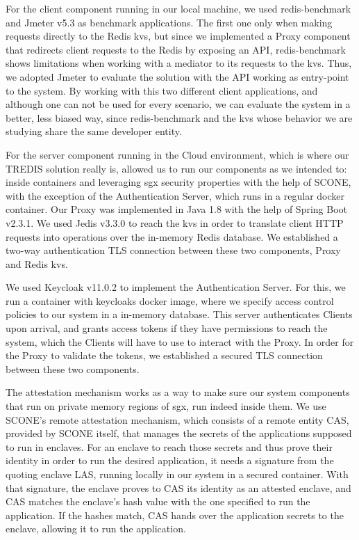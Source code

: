 For the client component running in our local machine, we used redis-benchmark and Jmeter v5.3 as benchmark applications. 
The first one only when making requests directly to the Redis \gls{kvs}, but since we implemented a Proxy component that redirects client requests to the Redis by exposing an API, redis-benchmark shows limitations when working with a mediator to its requests to the \gls{kvs}. Thus, we adopted Jmeter to evaluate the solution with the API working as entry-point to the system. By working with this two different client applications, and although one can not be used for every scenario, we can evaluate the system in a better, less biased way, since redis-benchmark and the \gls{kvs} whose behavior we are studying share the same developer entity.

For the server component running in the Cloud environment, which is where our TREDIS solution really is, allowed us to run our components as we intended to: inside containers and leveraging \gls{sgx} security properties with the help of SCONE, with the exception of the Authentication Server, which runs in a regular docker container. 
Our Proxy was implemented in Java 1.8 with the help of Spring Boot v2.3.1. We used Jedis v3.3.0 to reach the \gls{kvs} in order to translate client HTTP requests into operations over the in-memory Redis database. We established a two-way authentication TLS connection between these two components, Proxy and Redis \gls{kvs}.

We used Keycloak v11.0.2 to implement the Authentication Server. For this, we run a container with keycloaks docker image, where we specify access control policies to our system in a in-memory database. This server authenticates Clients upon arrival, and grants access tokens if they have permissions to reach the system, which the Clients will have to use to interact with the Proxy. In order for the Proxy to validate the tokens, we established a secured TLS connection between these two components.

The attestation mechanism works as a way to make sure our system components that run on private memory regions of \gls{sgx}, run indeed inside them. We use SCONE's remote attestation mechanism, which consists of a remote entity CAS, provided by SCONE itself, that manages the secrets of the applications supposed to run in enclaves. For an enclave to reach those secrets and thus prove their identity in order to run the desired application, it needs a signature from the quoting enclave LAS, running locally in our system in a secured container. With that signature, the enclave proves to CAS its identity as an attested enclave, and CAS matches the enclave's hash value with the one specified to run the application. If the hashes match, CAS hands over the application secrets to the enclave, allowing it to run the application.

